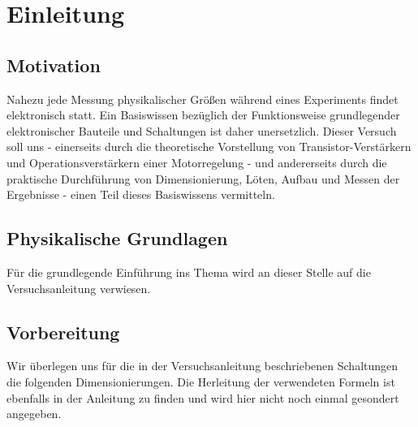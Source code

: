 \section{Einleitung}
%
\subsection{Motivation}
%
Nahezu jede Messung physikalischer Größen während eines Experiments findet elektronisch statt.
Ein Basiswissen bezüglich der Funktionsweise grundlegender elektronischer Bauteile und Schaltungen ist daher unersetzlich.
Dieser Versuch soll uns - einerseits durch die theoretische Vorstellung von Transistor-Verstärkern und Operationsverstärkern einer Motorregelung - und andererseits durch die praktische Durchführung von Dimensionierung, Löten, Aufbau und Messen der Ergebnisse - einen Teil dieses Basiswissens vermitteln.
%
\subsection{Physikalische Grundlagen}
%
Für die grundlegende Einführung ins Thema wird an dieser Stelle auf die Versuchsanleitung \cite{Anleitung} verwiesen.
%
\subsection{Vorbereitung}
%
Wir überlegen uns für die in der Versuchsanleitung \cite{Anleitung} beschriebenen Schaltungen die folgenden Dimensionierungen.
Die Herleitung der verwendeten Formeln ist ebenfalls in der Anleitung zu finden und wird hier nicht noch einmal gesondert angegeben.
%
